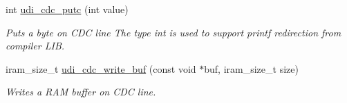 \begin{DoxyCompactItemize}
int \hyperlink{group__udi__cdc__group_ga8faae3fcf4911017c0fcf0aa127179f6}{udi\-\_\-cdc\-\_\-putc} (int value)
\begin{DoxyCompactList}\small\item\em Puts a byte on C\-D\-C line The type int is used to support printf redirection from compiler L\-I\-B. \end{DoxyCompactList}\item 
iram\-\_\-size\-\_\-t \hyperlink{group__udi__cdc__group_ga705496169ff423f3e3d3b5ff882d3f9b}{udi\-\_\-cdc\-\_\-write\-\_\-buf} (const void $\ast$buf, iram\-\_\-size\-\_\-t size)
\begin{DoxyCompactList}\small\item\em Writes a R\-A\-M buffer on C\-D\-C line. \end{DoxyCompactList}\end{DoxyCompactItemize}

